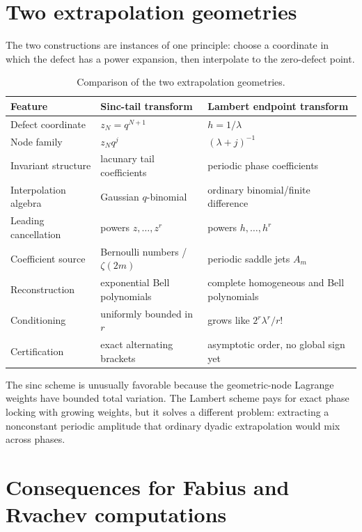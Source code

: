 \documentclass[11pt]{article}
\numberwithin{equation}{section}
\theoremstyle{definition}
\theoremstyle{remark}
\begin{document}
\section{Two extrapolation geometries}
\label{p8:sec:dual-geometries}

The two constructions are instances of one principle: choose a coordinate in which the defect has a power expansion, then interpolate to the zero-defect point.

\begin{table}[htbp]
\centering
\caption{Comparison of the two extrapolation geometries.}
\label{p8:tab:geometries}
\begin{tabularx}{\textwidth}{@{}l X X@{}}
\toprule
Feature & Sinc-tail transform & Lambert endpoint transform \\
\midrule
Defect coordinate & $z_N=q^{N+1}$ & $h=1/\lambda$ \\
Node family & $z_Nq^j$ & $(\lambda+j)^{-1}$ \\
Invariant structure & lacunary tail coefficients & periodic phase coefficients \\
Interpolation algebra & Gaussian $q$-binomial & ordinary binomial/finite difference \\
Leading cancellation & powers $z,\ldots,z^r$ & powers $h,\ldots,h^r$ \\
Coefficient source & Bernoulli numbers / $\zeta(2m)$ & periodic saddle jets $A_m$ \\
Reconstruction & exponential Bell polynomials & complete homogeneous and Bell polynomials \\
Conditioning & uniformly bounded in $r$ & grows like $2^r\lambda^r/r!$ \\
Certification & exact alternating brackets & asymptotic order, no global sign yet \\
\bottomrule
\end{tabularx}
\end{table}

The sinc scheme is unusually favorable because the geometric-node Lagrange weights have bounded total variation. The Lambert scheme pays for exact phase locking with growing weights, but it solves a different problem: extracting a nonconstant periodic amplitude that ordinary dyadic extrapolation would mix across phases.

\section{Consequences for Fabius and Rvachev computations}
\label{p8:sec:consequences}
\end{document}
